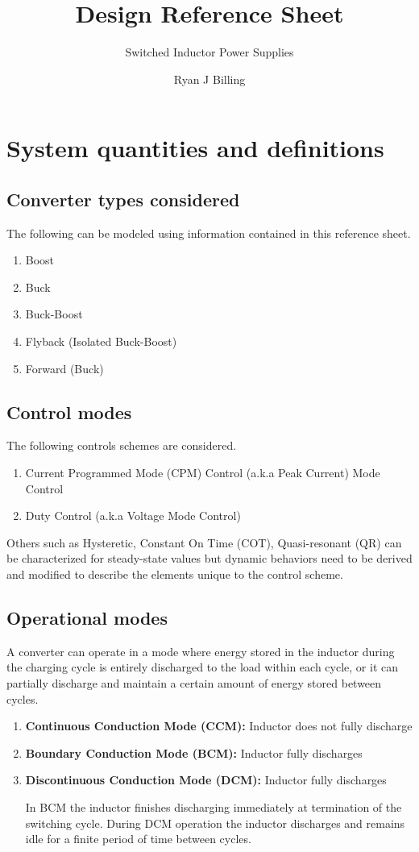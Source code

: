 \documentclass{scrartcl}
\author{Ryan J Billing}
\title{Design Reference Sheet}
\subtitle{Switched Inductor Power Supplies}
\begin{document}
\maketitle
	\section{System quantities and definitions}
		
		\subsection{Converter types considered}
			The following can be modeled using information contained in this reference sheet.
			\begin{enumerate}
				\item Boost
				\item Buck
				\item Buck-Boost
				\item Flyback (Isolated Buck-Boost)
				\item Forward (Buck)
			\end{enumerate}
		
		\subsection{Control modes}
			The following controls schemes are considered.		
			\begin{enumerate}
			\item Current Programmed Mode (CPM) Control (a.k.a Peak Current) Mode Control
			\item Duty Control (a.k.a Voltage Mode Control)
			\end{enumerate}
		
			Others such as Hysteretic, Constant On Time (COT), Quasi-resonant (QR) can be characterized for steady-state values but dynamic behaviors need to be derived and modified to describe the elements unique to the control scheme.
		\subsection{Operational modes}
		A converter can operate in a mode where energy stored in the inductor during the charging cycle is entirely discharged to the load within each cycle, or it can partially discharge and maintain a certain amount of energy stored between cycles.		
		\begin{enumerate}
			\item \textbf{Continuous Conduction Mode (CCM):} Inductor does not fully discharge
			\item \textbf{Boundary Conduction Mode (BCM):} Inductor fully discharges
			\item \textbf{Discontinuous Conduction Mode (DCM):} Inductor fully discharges
			
			In BCM the inductor finishes discharging immediately at termination of the switching cycle. During DCM operation the inductor discharges and remains idle for a finite period of time between cycles.
		\end{enumerate}	
\end{document}
